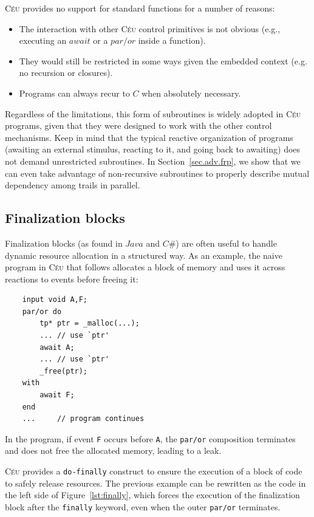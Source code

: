 \documentclass[preprint]{sigplanconf}
\newcommand{\CEU}{\textsc{C\'{e}u}\xspace}
\newcommand{\code}[1] {{\small{\texttt{#1}}}}
\newcommand{\DOFIN}{\code{do-finally}\xspace}
\newcommand{\FIN}{\code{finally}\xspace}
\newcommand{\1}{\;}
\newcommand{\2}{\;\;}
\newcommand{\3}{\;\;\;}
\newcommand{\5}{\;\;\;\;\;}
\begin{document}
\vspace{5pt}
\CEU provides no support for standard functions for a number of reasons:
\begin{itemize}
\item The interaction with other \CEU control primitives is not obvious (e.g., 
executing an $await$ or a $par/or$ inside a function).
\item They would still be restricted in some ways given the embedded context 
(e.g.  no recursion or closures).
\item Programs can always recur to $C$ when absolutely necessary.
\end{itemize}

Regardless of the limitations, this form of subroutines is widely adopted in 
\CEU programs, given that they were designed to work with the other control 
mechanisms.
Keep in mind that the typical reactive organization of programs (awaiting an 
external stimulus, reacting to it, and going back to awaiting) does not demand 
unrestricted subroutines.
In Section~\ref{sec.adv.frp}, we show that we can even take advantage of 
non-recursive subroutines to properly describe mutual dependency among trails 
in parallel.

\subsection{Finalization blocks}
\label{sec.adv.fin}

Finalization blocks (as found in $Java$ and $C\#$) are often useful to handle 
dynamic resource allocation in a structured way.
As an example, the naive program in \CEU that follows allocates a block of 
memory and uses it across reactions to events before freeing it:

{\small
\begin{verbatim}
    input void A,F;
    par/or do
        tp* ptr = _malloc(...);
        ... // use `ptr'
        await A;
        ... // use `ptr'
        _free(ptr);
    with
        await F;
    end
    ...     // program continues
\end{verbatim}
}

In the program, if event \code{F} occurs before \code{A}, the \code{par/or} 
composition terminates and does not free the allocated memory, leading to a 
leak.

\CEU provides a \DOFIN construct to ensure the execution of a block of code to 
safely release resources.
The previous example can be rewritten as the code in the left side of
Figure~\ref{lst:finally}, which forces the execution of the finalization block 
after the \FIN keyword, even when the outer \code{par/or} terminates.
\end{document}
